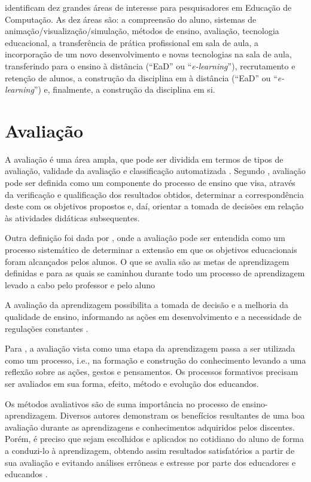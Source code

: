 \documentclass[
	12pt,				%
	openright,			%
	oneside,
	a4paper,			%
	english,			%
	french,				%
	spanish,			%
	brazil,				%
	]{abntex2}
\begin{document}
 identificam dez grandes áreas de interesse para pesquisadores em Educação de Computação. As dez áreas são: a compreensão do aluno, sistemas de animação/visualização/simulação, métodos de ensino, avaliação, tecnologia educacional, a transferência de prática profissional em sala de aula, a incorporação de um novo desenvolvimento e novas tecnologias na sala de aula, transferindo para o ensino à distância (“EaD” ou “\textit{e-learning}”), recrutamento e retenção de alunos, a construção da disciplina em à distância (“EaD” ou “\textit{e-learning}”) e, finalmente, a construção da disciplina em si. 


\section{Avaliação}
\label{sec:AVA}
A avaliação é uma área ampla, que pode ser dividida em termos de tipos de avaliação, validade da avaliação e classificação automatizada \cite{fincher2005mapping}. Segundo , avaliação pode ser definida como um componente do processo de ensino que visa, através da verificação e qualificação dos resultados obtidos, determinar a correspondência  deste com os objetivos propostos e, daí, orientar a tomada de decisões em relação às atividades didáticas subsequentes.

Outra definição foi dada por , onde a avaliação pode ser entendida como um processo sistemático de determinar a extensão em que os objetivos educacionais foram alcançados pelos alunos. O que se avalia são as metas de aprendizagem definidas e para as quais se caminhou durante todo um processo de aprendizagem levado a cabo pelo professor e pelo aluno

A avaliação da aprendizagem possibilita a tomada de decisão e a melhoria da qualidade de ensino, informando as ações em desenvolvimento e a necessidade de regulações constantes \cite{kraemer2005avaliaccao}.

Para , a avaliação vista como uma etapa da aprendizagem passa a ser utilizada como um processo, i.e., na formação e construção do conhecimento levando a uma reflexão sobre as ações, gestos e pensamentos. Os processos formativos precisam ser avaliados em sua forma, efeito, método e evolução dos educandos.

Os métodos avaliativos são de suma importância no processo de ensino-aprendizagem. Diversos autores demonstram os benefícios resultantes de uma boa avaliação durante as aprendizagens e conhecimentos adquiridos pelos discentes. Porém, é preciso que sejam escolhidos e aplicados no cotidiano do aluno de forma a conduzi-lo à aprendizagem, obtendo assim resultados satisfatórios a partir de sua avaliação e evitando análises errôneas e estresse por parte dos educadores e educandos \cite{da2014alunos}.
\end{document}
